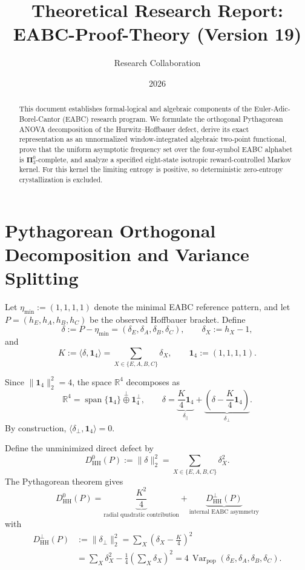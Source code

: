 \documentclass[11pt,a4paper]{article}
\title{Theoretical Research Report: EABC-Proof-Theory (Version 19)}
\author{Research Collaboration}
\date{2026}
\DeclareMathOperator{\Var}{Var}
\begin{document}
\maketitle

\begin{abstract}
This document establishes formal-logical and algebraic components of the
Euler-Adic-Borel-Cantor (EABC) research program. We formulate the orthogonal
Pythagorean ANOVA decomposition of the Hurwitz--Hoffbauer defect, derive its
exact representation as an unnormalized window-integrated algebraic two-point
functional, prove that the uniform asymptotic frequency set over the four-symbol
EABC alphabet is $\mathbf{\Pi}^0_3$-complete, and analyze a specified
eight-state isotropic reward-controlled Markov kernel. For this kernel the
limiting entropy is positive, so deterministic zero-entropy crystallization is
excluded.
\end{abstract}

\section{Pythagorean Orthogonal Decomposition and Variance Splitting}

Let $\eta_{\min}:=(1,1,1,1)$ denote the minimal EABC reference pattern,
and let $P=(h_E,h_A,h_B,h_C)$ be the observed Hoffbauer bracket. Define
\[
\delta:=P-\eta_{\min}
=(\delta_E,\delta_A,\delta_B,\delta_C),
\qquad
\delta_X:=h_X-1,
\]
and
\[
K:=\langle\delta,\mathbf 1_4\rangle
=\sum_{X\in\{E,A,B,C\}}\delta_X,
\qquad
\mathbf 1_4:=(1,1,1,1).
\]

Since $\|\mathbf 1_4\|_2^2=4$, the space $\mathbb R^4$ decomposes as
\[
\mathbb R^4
=\operatorname{span}\{\mathbf 1_4\}
\mathbin{\overset{\perp}{\oplus}}
\mathbf 1_4^\perp,
\qquad
\delta
=\underbrace{\frac K4\mathbf 1_4}_{\delta_\parallel}
+\underbrace{\left(\delta-\frac K4\mathbf 1_4\right)}_{\delta_\perp}.
\]
By construction, $\langle\delta_\perp,\mathbf 1_4\rangle=0$.

Define the unminimized direct defect by
\[
D_{\mathrm{HH}}^0(P)
:=\|\delta\|_2^2
=\sum_{X\in\{E,A,B,C\}}\delta_X^2.
\]
The Pythagorean theorem gives
\[
\boxed{
D_{\mathrm{HH}}^0(P)
=\underbrace{\frac{K^2}{4}}_{\text{radial quadratic contribution}}
+\underbrace{D_{\mathrm{HH}}^\perp(P)}_{
\text{internal EABC asymmetry}}
}
\]
with
\[
\begin{aligned}
D_{\mathrm{HH}}^\perp(P)
&:=\|\delta_\perp\|_2^2
=\sum_X\left(\delta_X-\frac K4\right)^2\\
&=\sum_X\delta_X^2-\frac14\left(\sum_X\delta_X\right)^2
=4\,\Var_{\mathrm{pop}}(\delta_E,\delta_A,\delta_B,\delta_C).
\end{aligned}
\]
\end{document}
